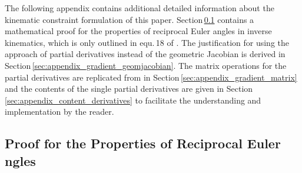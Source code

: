 \documentclass[robotics,article,accept,moreauthors,pdftex]{Definitions/mdpi}
\begin{document}
The following appendix contains additional detailed information about the kinematic constraint formulation of this paper.
Section\,\ref{sec:appendix_eulerreciproc} contains a mathematical proof for the properties of reciprocal Euler angles in inverse kinematics, which is only outlined in equ.\,18 of \cite{1_SchapplerTapOrt2019}.
The justification for using the approach of partial derivatives instead of the geometric Jacobian is derived in Section\,\ref{sec:appendix_gradient_geomjacobian}.
The matrix operations for the partial derivatives are replicated from \cite{1_SchapplerTapOrt2019} in Section\,\ref{sec:appendix_gradient_matrix} and the contents of the single partial derivatives are given in Section\,\ref{sec:appendix_content_derivatives} to facilitate the understanding and implementation by the reader.

\subsection{Proof for the Properties of Reciprocal Euler ngles}
\label{sec:appendix_eulerreciproc}
\end{document}
